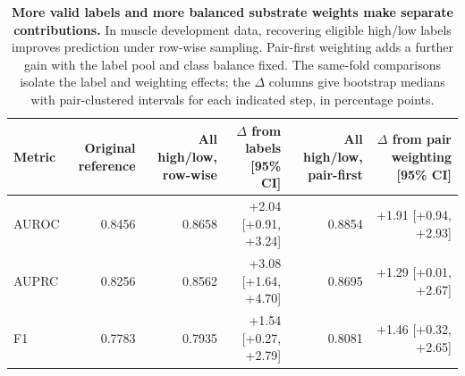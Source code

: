 \begin{table}[H]
\centering
\caption{\textbf{More valid labels and more balanced substrate weights make separate contributions.} In muscle development data, recovering eligible high/low labels improves prediction under row-wise sampling. Pair-first weighting adds a further gain with the label pool and class balance fixed. The same-fold comparisons isolate the label and weighting effects; the $\Delta$ columns give bootstrap medians with pair-clustered intervals for each indicated step, in percentage points.}\label{tab:supervisiondecomposition}
\begin{tabular}{lrrr@{\hspace{2\tabcolsep}\hspace{0.6em}}rr}
\toprule
Metric & Original reference & All high/low, row-wise & $\Delta$ from labels [95\% CI] & All high/low, pair-first & $\Delta$ from pair weighting [95\% CI] \\
\midrule
AUROC & 0.8456 & 0.8658 & +2.04 [+0.91, +3.24] & 0.8854 & +1.91 [+0.94, +2.93] \\
AUPRC & 0.8256 & 0.8562 & +3.08 [+1.64, +4.70] & 0.8695 & +1.29 [+0.01, +2.67] \\
F1 & 0.7783 & 0.7935 & +1.54 [+0.27, +2.79] & 0.8081 & +1.46 [+0.32, +2.65] \\
\bottomrule
\end{tabular}
\end{table}
